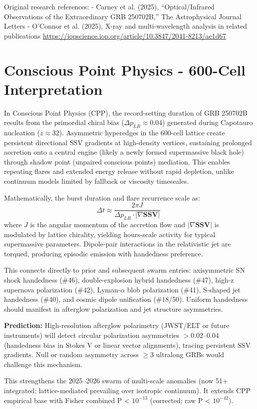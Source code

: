 \documentclass[11pt]{article}
\begin{document}
Original research references:  
- Carney et al. (2025), ``Optical/Infrared Observations of the Extraordinary GRB 250702B,'' The Astrophysical Journal Letters  
- O’Connor et al. (2025), X-ray and multi-wavelength analysis in related publications  
\url{https://iopscience.iop.org/article/10.3847/2041-8213/ae1d67}

\section{Conscious Point Physics - 600-Cell Interpretation}
In Conscious Point Physics (CPP), the record-setting duration of GRB 250702B results from the primordial chiral bias ($\Delta p_{LR} \approx 0.04$) generated during Capotauro nucleation ($z \approx 32$). Asymmetric hyperedges in the 600-cell lattice create persistent directional SSV gradients at high-density vertices, sustaining prolonged accretion onto a central engine (likely a newly formed supermassive black hole) through shadow point (unpaired conscious points) mediation. This enables repeating flares and extended energy release without rapid depletion, unlike continuum models limited by fallback or viscosity timescales.

Mathematically, the burst duration and flare recurrence scale as:  
\[
\Delta t \approx \frac{2\pi J}{\Delta p_{LR} \cdot |\nabla \mathbf{SSV}|}
\]  
where $J$ is the angular momentum of the accretion flow and $|\nabla \mathbf{SSV}|$ is modulated by lattice chirality, yielding hours-scale activity for typical supermassive parameters. Dipole-pair interactions in the relativistic jet are torqued, producing episodic emission with handedness preference.

This connects directly to prior and subsequent swarm entries: axisymmetric SN shock handedness (\#46), double-explosion hybrid handedness (\#47), high-z supernova polarization (\#42), Lyman-$\alpha$ blob polarization (\#41), S-shaped jet handedness (\#40), and cosmic dipole unification (\#18/50). Uniform handedness should manifest in afterglow polarization and jet structure asymmetries.

\textbf{Prediction:} High-resolution afterglow polarimetry (JWST/ELT or future instruments) will detect circular polarization asymmetries $> 0.02$--$0.04$ (handedness bias in Stokes V or linear vector alignments), tracing persistent SSV gradients. Null or random asymmetry across $\geq 3$ ultralong GRBs would challenge this mechanism.

This strengthens the 2025--2026 swarm of multi-scale anomalies (now 51+ integrated; lattice-mediated prevailing over isotropic continuum). It extends CPP empirical base with Fisher combined P < $10^{-13}$ (corrected; raw P < $10^{-42}$).
\end{document}
